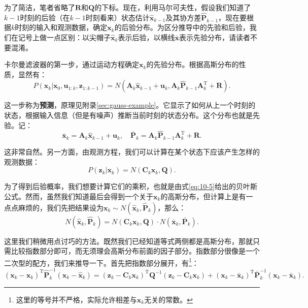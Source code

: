 为了简洁，笔者省略了$\bm{R}$和$\bm{Q}$的下标。现在，利用马尔可夫性，假设我们知道了$k-1$时刻的后验（在$k-1$时刻看来）状态估计$\bm{\hat{x}}_{k-1}$及其协方差$\bm{\hat{P}}_{k-1}$，现在要根据$k$时刻的输入和观测数据，确定$\bm{x}_k$的后验分布。为区分推导中的先验和后验，我们在记号上做一点区别：以尖帽子$\bm{\hat{x}}_k$表示后验，以横线$\bar{\bm{x}}$表示先验分布，请读者不要混淆。

卡尔曼滤波器的第一步，通过运动方程确定$\bm{x}_k$的先验分布。根据高斯分布的性质，显然有：
\begin{equation}
P\left( {{\bm{x}_k}|{\bm{x}_0},{\bm{u}_{1:k}},{\bm{z}_{1:k - 1}}} \right) = N\left( {\bm{A}_k {{\hat{\bm{x}}}_{k - 1}} + {\bm{u}_k}, \bm{A}_k\hat{\bm{P}}_{k-1} {\bm{A}_k^\mathrm{T}} + \bm{R}} \right).
\end{equation}

这一步称为\textbf{预测}，原理见附录\ref{sec:gauss-example}。它显示了如何从上一个时刻的状态，根据输入信息（但是有噪声）推断当前时刻的状态分布。这个分布也就是先验。记：
\begin{equation}
\bar{\bm{x}}_k = {\bm{A}_k {{\hat{\bm{x}}}_{k - 1}} + {\bm{u}_k}}, \quad \bar{\bm{P}}_k = {\bm{A}_k \hat{\bm{P}}_{k-1} { \bm{A}^\mathrm{T}_k} + \bm{R}}.
\end{equation}

这非常自然。另一方面，由观测方程，我们可以计算在某个状态下应该产生怎样的观测数据：
\begin{equation}
P\left( {{\bm{z}_k}|{\bm{x}_k}} \right) = N\left( {{\bm{C}_k}{\bm{x}_k},\bm{Q}} \right) .
\end{equation}

为了得到后验概率，我们想要计算它们的乘积，也就是由式\eqref{eq:10-5}给出的贝叶斯公式。然而，虽然我们知道最后会得到一个关于$\bm{x}_k$的高斯分布，但计算上是有一点点麻烦的，我们先把结果设为$\bm{x}_k \sim N(\bm{\hat{x}}_k, \bm{\hat{P}}_k )$，那么：
\begin{equation}
N(\bm{\hat{x}}_k, \bm{\hat{P}}_k ) = N\left( {{\bm{C}_k}{\bm{x}_k},\bm{Q}} \right) \cdot N( \bm{\bar{x}}_k, \bm{\bar{P}}_k). 
\end{equation}

这里我们稍微用点讨巧的方法。既然我们已经知道等式两侧都是高斯分布，那就只需比较指数部分即可，而无须理会高斯分布前面的因子部分。指数部分很像是一个二次型的配方，我们来推导一下。首先把指数部分展开，有\footnote{这里的等号并不严格，实际允许相差与$\bm{x}_k$无关的常数。}：
\begin{equation}
{\left( {{\bm{x}_k} - {{\hat{\bm{x}}}_k}} \right)^\mathrm{T}}\hat{\bm{P}}_k^{ - 1}\left( {{\bm{x}_k} - {{\hat{\bm{x}}}_k}} \right) = {\left( {{\bm{z}_k} - {\bm{C}_k} {\bm{x}_k}} \right)^\mathrm{T}}{\bm{Q}^{ - 1}}\left( {{\bm{z}_k} - {\bm{C}_k}{\bm{x}_k}} \right) + {\left( {{\bm{x}_k} - {{\bar{\bm{x}}}_k}} \right)^\mathrm{T}}\bar{\bm{P}}_k^{ - 1}\left( {\bm{x}_k - {{\bar{\bm{x}}}_k}} \right).
\end{equation}

